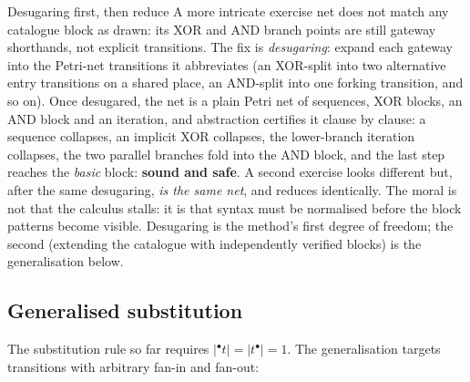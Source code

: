 \begin{examplebox}{Desugaring first, then reduce}
A more intricate exercise net does not match any catalogue block as drawn: its XOR and AND branch points are still gateway shorthands, not explicit transitions. The fix is \emph{desugaring}: expand each gateway into the Petri-net transitions it abbreviates (an XOR-split into two alternative entry transitions on a shared place, an AND-split into one forking transition, and so on). Once desugared, the net is a plain Petri net of sequences, XOR blocks, an AND block and an iteration, and abstraction certifies it clause by clause: a sequence collapses, an implicit XOR collapses, the lower-branch iteration collapses, the two parallel branches fold into the AND block, and the last step reaches the \emph{basic} block: \textbf{sound and safe}. A second exercise looks different but, after the same desugaring, \emph{is the same net}, and reduces identically. The moral is not that the calculus stalls: it is that syntax must be normalised before the block patterns become visible. Desugaring is the method's first degree of freedom; the second (extending the catalogue with independently verified blocks) is the generalisation below.
\end{examplebox}

\subsection{Generalised substitution}

The substitution rule so far requires $|{}^\bullet t| = |t^\bullet| = 1$. The generalisation targets transitions with arbitrary fan-in and fan-out:
\begin{center}
\end{center}

